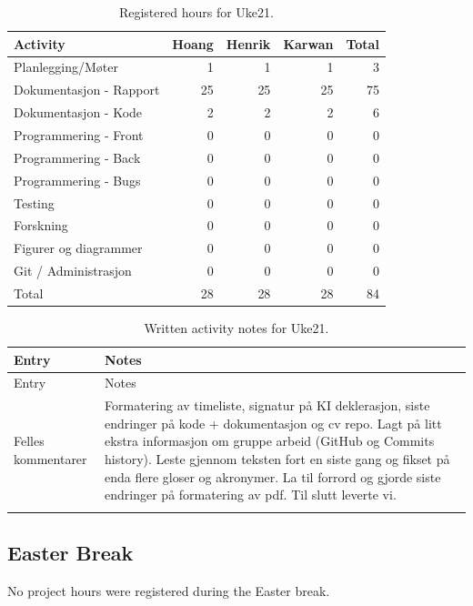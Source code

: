 \begin{table}[H]
\centering
\small
\caption{Registered hours for Uke21.}
\label{tab:project-hours-uke21}
\begin{tabular}{lrrrr}
\toprule
Activity & Hoang & Henrik & Karwan & Total \\
\midrule
Planlegging/Møter & 1 & 1 & 1 & 3 \\
Dokumentasjon - Rapport & 25 & 25 & 25 & 75 \\
Dokumentasjon - Kode & 2 & 2 & 2 & 6 \\
Programmering - Front & 0 & 0 & 0 & 0 \\
Programmering - Back & 0 & 0 & 0 & 0 \\
Programmering - Bugs & 0 & 0 & 0 & 0 \\
Testing & 0 & 0 & 0 & 0 \\
Forskning & 0 & 0 & 0 & 0 \\
Figurer og diagrammer & 0 & 0 & 0 & 0 \\
Git / Administrasjon & 0 & 0 & 0 & 0 \\
\midrule
Total & 28 & 28 & 28 & 84 \\
\bottomrule
\end{tabular}
\end{table}

\begin{longtable}{p{}p{}}
\caption{Written activity notes for Uke21.}\\
\toprule
Entry & Notes \\
\midrule
\endfirsthead
\toprule
Entry & Notes \\
\midrule
\endhead
Felles kommentarer & Formatering av timeliste, signatur på KI deklerasjon, siste endringer på kode + dokumentasjon og cv repo. Lagt på litt ekstra informasjon om gruppe arbeid (GitHub og Commits history). Leste gjennom teksten fort en siste gang og fikset på enda flere gloser og akronymer. La til forrord og gjorde siste endringer på formatering av pdf. Til slutt leverte vi. \\
\addlinespace
\bottomrule
\end{longtable}

\subsection{Easter Break}
No project hours were registered during the Easter break.
